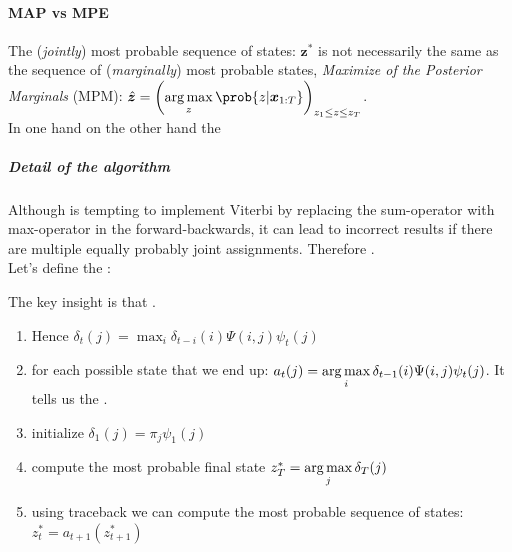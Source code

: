 \paragraph{MAP vs MPE}
The (\emph{jointly}) most probable sequence of states: $\bm{z}^{*}$ is not necessarily the same as 
the sequence of (\emph{marginally}) most probable states, \emph{Maximize of the Posterior Marginals}
(MPM): $\hat{\bm{z}}=\left(\displaystyle\argmax_{
z} \prob{z|\bm{x}_{1:T}}\right)_{z_{1}\leq z\leq z_{T}}$.\\
In one hand  on the other hand
the 
\subparagraph{Detail of the algorithm}
Although is tempting to implement Viterbi by replacing the sum-operator with max-operator in the
forward-backwards, it can lead to incorrect results if there are multiple equally probably joint
assignments. Therefore .\\
Let's define the :
\begin{center}
\end{center}
The key insight is that .
\begin{enumerate}
    \item Hence $\delta_{t}(j) = \displaystyle\max_{i}\delta_{t-i}(i)\Psi(i,j)\psi_{t}(j)$
    \item {} for each possible state that we end 
        up: $a_{t}(j) = \displaystyle\operatorname*{arg\,max}_{i}\delta_{t-1}(i)\Psi(i,j)\psi_{t}(j)$. It tells us the
        .
    \item initialize $\delta_{1}(j)=\pi_{j}\psi_{1}(j)$
    \item compute the most probable final state $z_{T}^{*}=\displaystyle\operatorname*{arg\,max}_{j}\delta_{T}(j)$
    \item using traceback we can compute the most probable sequence of states: $z_{t}^{*}=a_{t+1}(
        z^{*}_{t+1})$
\end{enumerate}

